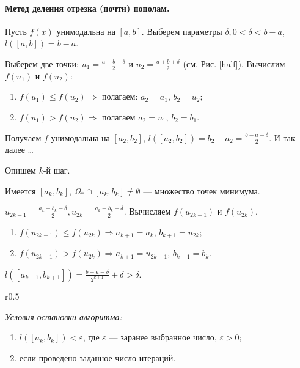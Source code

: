 \paragraph{Метод деления отрезка (почти) пополам.}  Пусть $f(x)$ унимодальна на $[a, b]$. Выберем параметры $\delta, 0 < \delta < b - a$, $l([a, b]) = b - a$.
\newline

Выберем две точки: $u_1 = \frac{a + b - \delta}{2}$ и $u_2 = \frac{a + b + \delta}{2}$ (см. Рис. \ref{half}).  Вычислим $f(u_1)$ и $f(u_2)$: 
\begin{enumerate}[label={\arabic*)}]
	\item $f(u_1) \leqslant f(u_2) \Rightarrow$ полагаем: $a_2 = a_1, \, b_2 = u_2$;
	\item $f(u_1 ) > f(u_2) \Rightarrow$ полагаем $a_2 = u_1, \, b_2 = b_1$.
\end{enumerate}

Получаем $f$ унимодальна на $[a_2, b_2]$, $l([a_2, b_2]) = b_2 - a_2 = \frac{b - a + \delta}{2}$. И так далее \dots
\newline

Опишем $k$-й шаг.

Имеется $[a_k, b_k]$, $\Omega_{\ast} \cap [a_k, b_k] \not = \emptyset$ --- множество точек минимума.

$u_{2 k - 1} = \frac{a_k + b_k - \delta}{2}, u_{2 k} = \frac{a_k + b_k + \delta}{2}$. Вычисляем $f(u_{2 k - 1})$ и $f(u_{2 k})$.
\begin{enumerate}[label={\arabic*)}]
	\item  $f(u_{2 k - 1}) \leqslant f(u_{2 k}) \Rightarrow a_{k + 1} = a_k, \, b_{k + 1} = u_{2 k}$;
	\item $f(u_{2 k - 1}) > f(u_{2 k}) \Rightarrow a_{k + 1} = u_{2 k - 1}, \, b_{k + 1} = b_k$.  
\end{enumerate}

$l([a_{k + 1}, b_{k + 1}]) = \frac{b - a - \delta}{2^{k + 1}} + \delta > \delta$.
\newline

\begin{wrapfigure}[10]{r}{0.5\linewidth}
	\centering
	
	\caption{Иллюстрация первого шага.}
	\label{half}
\end{wrapfigure}

\textit{Условия остановки алгоритма:}
\begin{enumerate}
	\item $l([a_k, b_k]) < \varepsilon$, где $\varepsilon$ --- заранее выбранное число, $\varepsilon > 0$; 
	
	\item если проведено заданное число итераций.
\end{enumerate}

